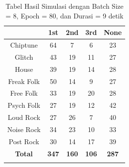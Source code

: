 \begin{longtable}[c]{|c|c|c|c|c|}
	\hline
	\textbf{}      & \textbf{1st} & \textbf{2nd} & \textbf{3rd} & \textbf{None} \\ \hline
	\endfirsthead
	\endhead
	Chiptune       & 64           & 7            & 6            & 23            \\ \hline
	Glitch         & 43           & 19           & 11           & 27            \\ \hline
	House          & 39           & 19           & 14           & 28            \\ \hline
	Freak Folk     & 50           & 14           & 9            & 27            \\ \hline
	Free Folk      & 33           & 19           & 20           & 28            \\ \hline
	Psych Folk     & 27           & 19           & 12           & 42            \\ \hline
	Loud Rock      & 27           & 26           & 7            & 40            \\ \hline
	Noise Rock     & 34           & 23           & 10           & 33            \\ \hline
	Post Rock      & 30           & 14           & 17           & 39            \\ \hline
	\textbf{Total} & \textbf{347} & \textbf{160} & \textbf{106} & \textbf{287}  \\ \hline
	\caption{Tabel Hasil Simulasi dengan Batch Size = 8, Epoch = 80, dan Durasi = 9 detik}
	\label{tab:my-table}\\
\end{longtable}

